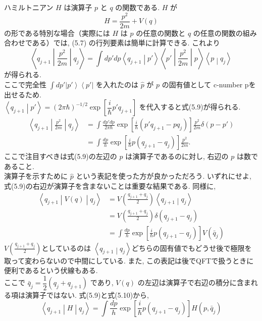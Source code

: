 \documentclass[a4paper,12pt]{article}
\newcommand{\bra}[1]{\left\langle #1\right|}
\newcommand{\ket}[1]{\left|#1\right\rangle}
\newcommand{\braket}[2]{\left\langle #1\middle|#2\right\rangle}
\newcommand{\brakets}[3]{\left\langle #1\middle| #2 \middle|#3 \right\rangle}
\begin{document}
\color{black}
ハミルトニアン $H$ は演算子 $p$ と $q$ の関数である. $H$ が
\begin{equation*}
    H = \frac{p^2}{2m} + V(q) \tag{5.8}
\end{equation*}
の形である特別な場合（実際には $H$ は $p$ の任意の関数と $q$ の任意の関数の組み合わせである）では, (5.7) の行列要素は簡単に計算できる. これより
\begin{equation*}
    \brakets{q_{j+1}}{\frac{p^2}{2m}}{q_{j}} = \int dp' dp \braket{q_{j+1}}{p'}\brakets{p'}{\frac{p^2}{2m}}{p}\braket{p}{q_j}
\end{equation*}
が得られる.\\
\color{blue}
ここで完全性 $\displaystyle \int dp' \ket{p'}\bra{p'}$ を入れたのは $\hat{p}$ が $p$ の固有値として c-number pを出せるため.\\
\color{black}
 $\braket{q_{j+1}}{p'} = (2\pi\hbar)^{-1/2}\exp\left[ \dfrac{i}{\hbar}p'q_{j+1} \right]$ を代入すると式(5.9)が得られる.
\begin{align*}
    \brakets{q_{j+1}}{\frac{p^2}{2m}}{q_j} &= \int \frac{dp' dp}{2\pi\hbar}\exp\left[ \frac{i}{\hbar}(p' q_{j+1} - pq_{j}) \right]\frac{p^2}{2m}\delta(p - p')\\
    &= \int \frac{dp}{h}\exp\left[ \frac{i}{\hbar}p(q_{j+1} - q_{j}) \right]\frac{p^2}{2m}. \tag{5.9}
\end{align*}
ここで注目すべきは式(5.9)の左辺の $p$ は演算子であるのに対し, 右辺の $p$ は数であること. \\
演算子を示すために $\hat{p}$ という表記を使った方が良かっただろう. いずれにせよ, 式(5.9)の右辺が演算子を含まないことは重要な結果である. 同様に,
\begin{align*}
    \brakets{q_{j+1}}{V(q)}{q_j} &= V\left( \frac{q_{j+1} + q_{j}}{2} \right)\braket{q_{j+1}}{q_{j}}\\
    &= V\left( \frac{q_{j+1} + q_{j}}{2} \right)\delta(q_{j+1} - q_{j})\\
    &= \int \frac{dp}{h}\exp\left[ \frac{i}{\hbar}p(q_{j+1} - q_{j}) \right]V(\bar{q}_{j}) \tag{5.10}
\end{align*}
\color{blue}
$\displaystyle V\left( \frac{q_{j+1} + q_j}{2} \right)$としているのは $\braket{q_{j+1}}{q_j}$どちらの固有値でもどうせ後で極限を取って変わらないので中間にしている. また, この表記は後でQFTで扱うときに便利であるという伏線もある.\\
\color{black}
ここで $\bar{q}_{j} = \dfrac{1}{2}(q_{j} + q_{j+1})$ であり, $V(q)$ の左辺は演算子で右辺の積分に含まれる項は演算子ではない. 式(5.9)と式(5.10)から,
\begin{equation*}
    \brakets{q_{j+1}}{H}{q_{j}} = \int \frac{dp}{h} \exp\left[ \frac{i}{\hbar}p(q_{j+1} - q_{j}) \right] H(p, \bar{q}_{j})
\end{equation*}
\end{document}
